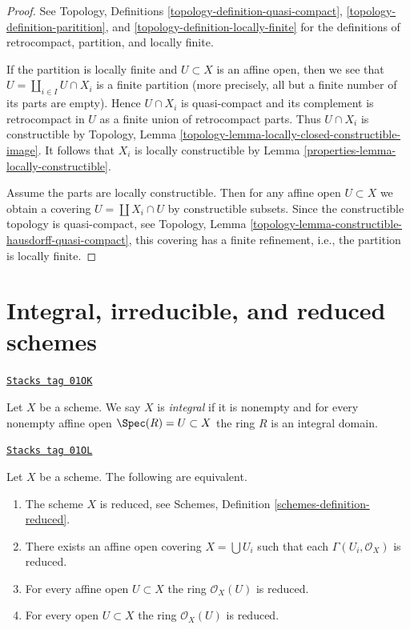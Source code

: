 \begin{proof}

See Topology, Definitions
\ref{topology-definition-quasi-compact},
\ref{topology-definition-paritition}, and
\ref{topology-definition-locally-finite}
for the definitions of retrocompact, partition, and locally finite.

\medskip\noindent
If the partition is locally finite and $U \subset X$ is an
affine open, then we see that $U = \coprod_{i \in I} U \cap X_i$
is a finite partition (more precisely, all but a finite number
of its parts are empty). Hence $U \cap X_i$ is quasi-compact
and its complement is retrocompact in $U$ as a finite union
of retrocompact parts. Thus $U \cap X_i$ is constructible
by Topology, Lemma \ref{topology-lemma-locally-closed-constructible-image}.
It follows that $X_i$ is locally constructible by
Lemma \ref{properties-lemma-locally-constructible}.

\medskip\noindent
Assume the parts are locally constructible. Then for any affine
open $U \subset X$ we obtain a covering $U = \coprod X_i \cap U$
by constructible subsets. Since the constructible topology is
quasi-compact, see
Topology, Lemma \ref{topology-lemma-constructible-hausdorff-quasi-compact},
this covering has a finite refinement, i.e.,
the partition is locally finite.
\end{proof}

\section{Integral, irreducible, and reduced schemes}
\label{properties-section-integral}
\begin{definition}[Integral]
\label{properties-definition-integral}
\href{https://stacks.math.columbia.edu/tag/01OK}{\texttt{Stacks tag 01OK}}

Let $X$ be a scheme. We say $X$ is {\it integral} if it is nonempty and
for every nonempty affine open $\Spec(R) = U \subset X$ the ring $R$
is an integral domain.
\end{definition}

\begin{lemma}
\label{properties-lemma-characterize-reduced}
\href{https://stacks.math.columbia.edu/tag/01OL}{\texttt{Stacks tag 01OL}}

Let $X$ be a scheme.
The following are equivalent.
\begin{enumerate}
\item The scheme $X$ is reduced, see
Schemes, Definition \ref{schemes-definition-reduced}.
\item There exists an affine open covering $X = \bigcup U_i$
such that each $\Gamma(U_i, \mathcal{O}_X)$ is reduced.
\item For every affine open $U \subset X$ the ring
$\mathcal{O}_X(U)$ is reduced.
\item For every open $U \subset X$ the ring $\mathcal{O}_X(U)$ is reduced.
\end{enumerate}
\end{lemma}


